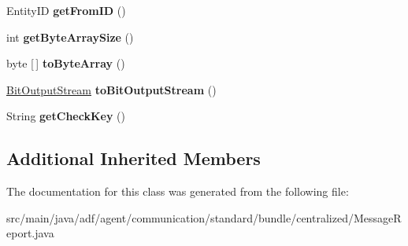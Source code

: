 \begin{DoxyCompactItemize}
\item 
\hypertarget{classadf_1_1agent_1_1communication_1_1standard_1_1bundle_1_1centralized_1_1MessageReport_af1b38bb335c11c7294811238a13f8272}{}\label{classadf_1_1agent_1_1communication_1_1standard_1_1bundle_1_1centralized_1_1MessageReport_af1b38bb335c11c7294811238a13f8272} 
Entity\+ID {\bfseries get\+From\+ID} ()
\item 
\hypertarget{classadf_1_1agent_1_1communication_1_1standard_1_1bundle_1_1centralized_1_1MessageReport_aaf6482d2496a30e82525420722c6effe}{}\label{classadf_1_1agent_1_1communication_1_1standard_1_1bundle_1_1centralized_1_1MessageReport_aaf6482d2496a30e82525420722c6effe} 
int {\bfseries get\+Byte\+Array\+Size} ()
\item 
\hypertarget{classadf_1_1agent_1_1communication_1_1standard_1_1bundle_1_1centralized_1_1MessageReport_a903b4d70f9975780b61466b1121dc9a4}{}\label{classadf_1_1agent_1_1communication_1_1standard_1_1bundle_1_1centralized_1_1MessageReport_a903b4d70f9975780b61466b1121dc9a4} 
byte \mbox{[}$\,$\mbox{]} {\bfseries to\+Byte\+Array} ()
\item 
\hypertarget{classadf_1_1agent_1_1communication_1_1standard_1_1bundle_1_1centralized_1_1MessageReport_a012d88c352ce3551a4c6bdc7685f2b92}{}\label{classadf_1_1agent_1_1communication_1_1standard_1_1bundle_1_1centralized_1_1MessageReport_a012d88c352ce3551a4c6bdc7685f2b92} 
\hyperlink{classadf_1_1component_1_1communication_1_1util_1_1BitOutputStream}{Bit\+Output\+Stream} {\bfseries to\+Bit\+Output\+Stream} ()
\item 
\hypertarget{classadf_1_1agent_1_1communication_1_1standard_1_1bundle_1_1centralized_1_1MessageReport_a760930f0020e968ddbd936d897e5e786}{}\label{classadf_1_1agent_1_1communication_1_1standard_1_1bundle_1_1centralized_1_1MessageReport_a760930f0020e968ddbd936d897e5e786} 
String {\bfseries get\+Check\+Key} ()
\end{DoxyCompactItemize}
\subsection*{Additional Inherited Members}


The documentation for this class was generated from the following file\+:\begin{DoxyCompactItemize}
\item 
src/main/java/adf/agent/communication/standard/bundle/centralized/Message\+Report.\+java\end{DoxyCompactItemize}
